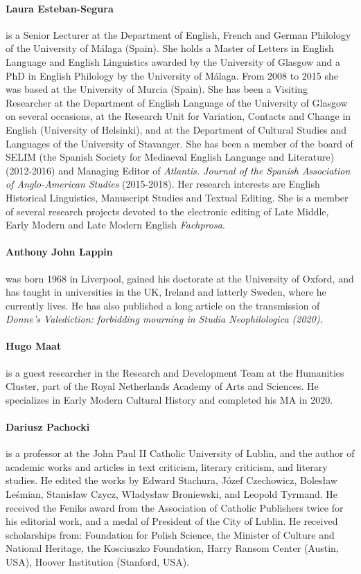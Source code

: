 \paragraph{Laura Esteban-Segura} is a Senior Lecturer at the Department of English, French and German Philology of the University of Málaga (Spain). She holds a Master of Letters in English Language and English Linguistics awarded by the University of Glasgow and a PhD in English Philology by the University of Málaga. From 2008 to 2015 she was based at the University of Murcia (Spain). She has been a Visiting Researcher at the Department of English Language of the University of Glasgow on several occasions, at the Research Unit for Variation, Contacts and Change in English (University of Helsinki), and at the Department of Cultural Studies and Languages of the University of Stavanger. She has been a member of the board of SELIM (the Spanish Society for Mediaeval English Language and Literature) (2012-2016) and Managing Editor of \emph{Atlantis. Journal of the Spanish Association of Anglo-American Studies} (2015-2018). Her research interests are English Historical Linguistics, Manuscript Studies and Textual Editing. She is a member of several research projects devoted to the electronic editing of Late Middle, Early Modern and Late Modern English \emph{Fachprosa}.


\paragraph{Anthony John Lappin} was born 1968 in Liverpool, gained his doctorate at the University of Oxford, and has taught in universities in the UK, Ireland and latterly Sweden, where he currently lives. He has also published a long article on the transmission of \emph{Donne’s Valediction: forbidding mourning in Studia Neophilologica (2020)}.

\paragraph{Hugo Maat} is a guest researcher in the Research and Development Team at the Humanities Cluster, part of the Royal Netherlands Academy of Arts and Sciences. He specializes in Early Modern Cultural History and completed his MA in 2020.

\paragraph{Dariusz Pachocki} is a professor at the John Paul II Catholic University of Lublin, and the author of academic works and articles in text criticism, literary criticism, and literary studies. He edited the works by Edward Stachura, Józef Czechowicz, Bolesław Leśmian, Stanisław Czycz, Władysław Broniewski, and Leopold Tyrmand. He received the Feniks award from the Association of Catholic Publishers twice for his editorial work, and a medal of President of the City of Lublin. He received scholarships from: Foundation for Polish Science, the Minister of Culture and National Heritage, the Kosciuszko Foundation, Harry Ransom Center (Austin, USA), Hoover Institution (Stanford, USA).

